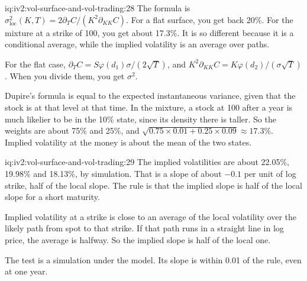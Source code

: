 \begin{solution}{iq:iv2:vol-surface-and-vol-trading:28}
The formula is $\sigma_{\text{loc}}^2(K, T) = 2\partial_TC/(K^2\partial_{KK}C)$. For a flat surface, you get back 20\%. For the mixture at a strike of 100, you get about 17.3\%. It is so different because it is a conditional average, while the implied volatility is an average over paths.

For the flat case, $\partial_TC = S\varphi(d_1)\sigma/(2\sqrt T)$, and $K^2\partial_{KK}C = K\varphi(d_2)/(\sigma\sqrt T)$. When you divide them, you get $\sigma^2$.

Dupire's formula is equal to the expected instantaneous variance, given that the stock is at that level at that time. In the mixture, a stock at 100 after a year is much likelier to be in the 10\% state, since its density there is taller. So the weights are about 75\% and 25\%, and $\sqrt{0.75 \times 0.01 + 0.25 \times 0.09} \approx 17.3\%$. Implied volatility at the money is about the mean of the two states.

\end{solution}

\begin{solution}{iq:iv2:vol-surface-and-vol-trading:29}
The implied volatilities are about 22.05\%, 19.98\% and 18.13\%, by simulation. That is a slope of about $-0.1$ per unit of log strike, half of the local slope. The rule is that the implied slope is half of the local slope for a short maturity.

Implied volatility at a strike is close to an average of the local volatility over the likely path from spot to that strike. If that path runs in a straight line in log price, the average is halfway. So the implied slope is half of the local one.

The test is a simulation under the model. Its slope is within 0.01 of the rule, even at one year.

\end{solution}

